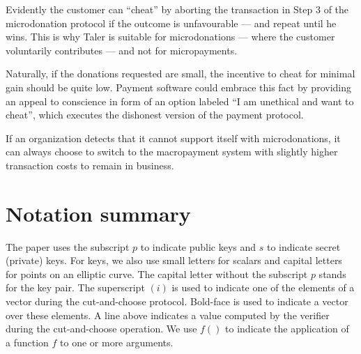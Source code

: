 \documentclass{llncs}
\begin{document}
Evidently the customer can ``cheat'' by aborting the transaction in
Step 3 of the microdonation protocol if the outcome is unfavourable ---
and repeat until he wins.  This is why Taler is suitable for
microdonations --- where the customer voluntarily contributes ---
and not for micropayments.

Naturally, if the donations requested are small, the incentive to
cheat for minimal gain should be quite low.  Payment software could
embrace this fact by providing an appeal to conscience in form of an
option labeled ``I am unethical and want to cheat'', which executes
the dishonest version of the payment protocol.

If an organization detects that it cannot support itself with
microdonations, it can always choose to switch to the macropayment
system with slightly higher transaction costs to remain in business.

\newpage
\section{Notation summary}

The paper uses the subscript $p$ to indicate public keys and $s$ to
indicate secret (private) keys.  For keys, we also use small letters
for scalars and capital letters for points on an elliptic curve.  The
capital letter without the subscript $p$ stands for the key pair.  The
superscript $(i)$ is used to indicate one of the elements of a vector
during the cut-and-choose protocol.  Bold-face is used to indicate a
vector over these elements.  A line above indicates a value computed
by the verifier during the cut-and-choose operation.  We use $f()$ to
indicate the application of a function $f$ to one or more arguments.
\end{document}
